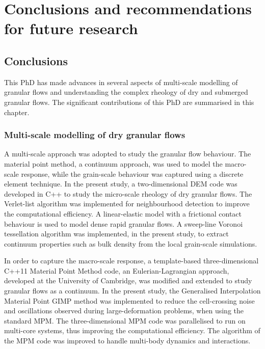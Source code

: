 \chapter{Conclusions and recommendations for future research}

\ifpdf
    \graphicspath{{Chapter7/figs/raster/}{Chapter7/figs/pdf/}{Chapter7/figs/}}
\else
    \graphicspath{{Chapter7/figs/vector/}{Chapter7/figs/}}
\fi
\section{Conclusions}

This PhD has made advances in several aspects of multi-scale modelling of 
granular flows and understanding the complex rheology of dry and submerged 
granular flows. The significant contributions of this PhD are summarised in 
this chapter.

\subsection{Multi-scale modelling of dry granular flows}

A multi-scale approach was adopted to study the granular flow behaviour. The 
material point method, a continuum approach, was used to model the macro-scale 
response, while the grain-scale behaviour was captured using a discrete element 
technique. In the present study, a two-dimensional DEM code was developed in 
C++ to study the micro-scale rheology of dry granular flows. The Verlet-list 
algorithm was implemented for neighbourhood detection to improve the 
computational efficiency. A linear-elastic model with a frictional contact 
behaviour is used to model dense rapid granular flows. A sweep-line Voronoi 
tessellation algorithm was implemented, in the present study, to extract 
continuum properties such as bulk density from the local grain-scale 
simulations.

In order to capture the macro-scale response, a template-based 
three-dimensional C++11 Material Point Method code, an Eulerian-Lagrangian 
approach, developed at the University of Cambridge, was modified and extended 
to study granular flows as a continuum. In the present study, the Generalised 
Interpolation Material Point GIMP method was implemented to reduce the 
cell-crossing noise and oscillations observed during large-deformation 
problems, when using the standard MPM. The three-dimensional MPM code was 
parallelised to run on multi-core systems, thus improving the computational 
efficiency. The algorithm of the MPM code was improved to handle multi-body 
dynamics and interactions.



